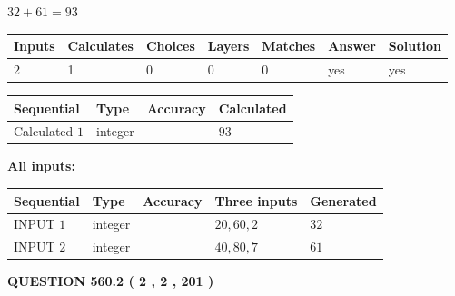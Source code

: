 \documentclass[12pt]{article}
\begin{document}
 

$ %
32 +  %
61=   %
93$
 
 
\noindent{}
 
 

 
   
   
   
   
\noindent\begin{tabular}{|l|l|l|l|l|l|l|}
 \hline
Inputs & Calculates & Choices & Layers & Matches & Answer & Solution \\ \hline
 2  & 
 1  & 
 0
  & 
 0  & 
 0  & 
  yes & 
  yes 
  \\ \hline
 \end{tabular}
   
   
   
   
\noindent{}
   
   
  
  
\noindent\begin{tabular}{|l|l|l|l|}
\hline
 Sequential & Type & Accuracy & Calculated \\ 
\hline
 
 
  Calculated $  1 $ & integer &  & 
  $ 93 $ 
 \\  \hline  
 \end{tabular}
   
   
   
   
\noindent\vspace{0.1in}\hspace{-0.08in} {\textbf{\Large{All inputs: }}}
   
   
  
  
\noindent\begin{tabular}{|l|l|l|l|l|}
\hline
 Sequential & Type & Accuracy & Three inputs & Generated \\ 
\hline
 
 
  INPUT $  1 $ & integer &  & $
 20
 , 
 60
 , 
 2
 $ & $ 32 $ 
 \\  \hline  
 
 
  INPUT $  2 $ & integer &  & $
 40
 , 
 80
 , 
 7
 $ & $ 61 $ 
 \\  \hline  
 \end{tabular}
   
   
  
\vspace{0.2in}
  
{\textbf{\Large{QUESTION
560.2 
 ( 2 , 2 , 201 )
}}}
  
\end{document}
